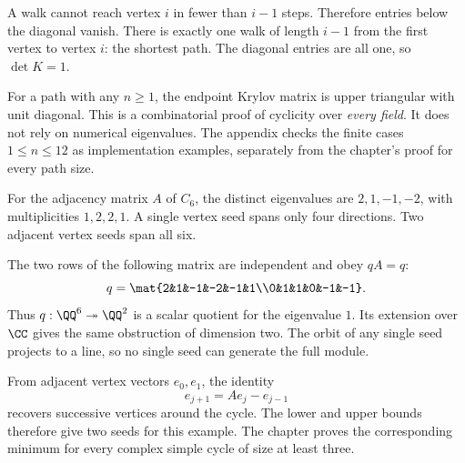 A walk cannot reach vertex $i$ in fewer than $i-1$ steps. Therefore entries below the diagonal vanish. There is exactly one walk of length $i-1$ from the first vertex to vertex $i$: the shortest path. The diagonal entries are all one, so $\det K=1$.

For a path with any $n\ge1$, the endpoint Krylov matrix is upper triangular with unit diagonal. This is a combinatorial proof of cyclicity over \emph{every field}. It does not rely on numerical eigenvalues. The appendix checks the finite cases $1\le n\le12$ as implementation examples, separately from the chapter's proof for every path size.


For the adjacency matrix $A$ of $C_6$, the distinct eigenvalues are $2,1,-1,-2$, with multiplicities $1,2,2,1$. A single vertex seed spans only four directions. Two adjacent vertex seeds span all six.


The two rows of the following matrix are independent and obey $qA=q$:
\[
q=\mat{2&1&-1&-2&-1&1\\0&1&1&0&-1&-1}.
\]
Thus $q:\QQ^6\twoheadrightarrow\QQ^2$ is a scalar quotient for the eigenvalue $1$. Its extension over $\CC$ gives the same obstruction of dimension two. The orbit of any single seed projects to a line, so no single seed can generate the full module.

From adjacent vertex vectors $e_0,e_1$, the identity
\[
e_{j+1}=Ae_j-e_{j-1}
\]
recovers successive vertices around the cycle. The lower and upper bounds therefore give two seeds for this example. The chapter proves the corresponding minimum for every complex simple cycle of size at least three.


